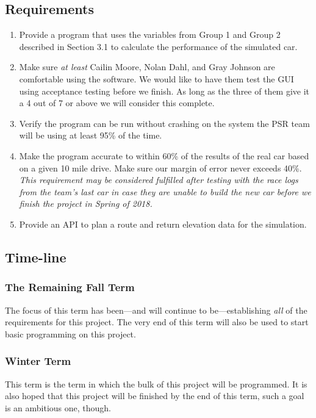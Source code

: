 \documentclass[onecolumn, draftclsnofoot,10pt, compsoc]{IEEEtran}
\begin{document}
\begin{singlespace}
    \subsection{Requirements}
    \begin{enumerate}
        \item Provide a program that uses the variables from Group 1 and Group 2 described in Section 3.1 to calculate the performance of the simulated car. 
        \item Make sure \textit{at least} Cailin Moore, Nolan Dahl, and Gray Johnson are comfortable using the software. We would like to have them test the GUI using acceptance testing before we finish. As long as the three of them give it a 4 out of 7 or above we will consider this complete.
        \item Verify the program can be run without crashing on the system the PSR team will be using at least 95\% of the time.
        \item Make the program accurate to within 60\% of the results of the real car based on a given 10 mile drive.
        Make sure our margin of error never exceeds 40\%. \textit{This requirement may be considered fulfilled after testing with the race logs from the team's last car in case they are unable to build the new car before we finish the project in Spring of 2018.}
        \item Provide an API to plan a route and return elevation data for the simulation.
    \end{enumerate}
    
    \subsection{Time-line}
        \subsubsection{The Remaining Fall Term}
        The focus of this term has been---and will continue to be---establishing \textit{all} of the requirements for this project. The very end of this term will also be used to start basic programming on this project.
        
        \subsubsection{Winter Term}
        This term is the term in which the bulk of this project will be programmed. It is also hoped that this project will be finished by the end of this term, such a goal is an ambitious one, though.
        

\end{singlespace}
\end{document}
